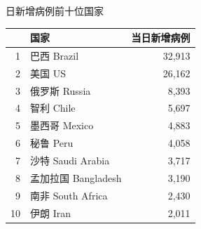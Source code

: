 \documentclass[
]{article}
\begin{document}
\begin{table}[H]

    \begin{minipage}{.4\linewidth}
    \centering
    \captionsetup{justification=centering}
    \caption{日新增病例前十位国家}
    \vspace{-0.5\baselineskip}
      \centering
    \captionsetup{justification=centering} \begin{table}[H]
\centering\begingroup\fontsize{12}{14}\selectfont

\begin{tabular}{rlr}
\toprule
  & 国家 & 当日新增病例\\
\midrule
\rowcolor{gray!6}  1 & 巴西 Brazil & 32,913\\
2 & 美国 US & 26,162\\
\rowcolor{gray!6}  3 & 俄罗斯 Russia & 8,393\\
4 & 智利 Chile & 5,697\\
\rowcolor{gray!6}  5 & 墨西哥 Mexico & 4,883\\
6 & 秘鲁 Peru & 4,058\\
\rowcolor{gray!6}  7 & 沙特 Saudi Arabia & 3,717\\
8 & 孟加拉国 Bangladesh & 3,190\\
\rowcolor{gray!6}  9 & 南非 South Africa & 2,430\\
10 & 伊朗 Iran & 2,011\\
\bottomrule
\end{tabular}
\endgroup{}
\end{table} \end{minipage}
    \begin{minipage}{.6\linewidth}
    \centering
    \captionsetup{justification=centering}
     \caption{累计死亡病例前十位国家}
     \vspace{-0.5\baselineskip}
      \centering
    \captionsetup{justification=centering} \begin{table}[H]
\centering\begingroup\fontsize{12}{14}\selectfont


\end{table}
\end{minipage}
\end{table}
\end{document}
